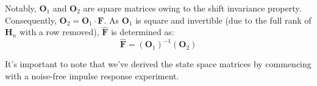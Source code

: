 \begin{enumerate}
        Notably, $\mathbf{O}_1$ and $\mathbf{O}_2$ are square matrices owing to the shift invariance property.
        Consequently, $\mathbf{O}_2=\mathbf{O}_1\cdot \mathbf{F}$.
        As $\mathbf{O}_1$ is square and invertible (due to the full rank of $\mathbf{H}_n$ with a row removed), $\hat{\mathbf{F}}$ is determined as:
        \[\hat{\mathbf{F}}=(\mathbf{O}_1)^{-1}(\mathbf{O}_2)\]
\end{enumerate}
It's important to note that we've derived the state space matrices by commencing with a noise-free impulse response experiment.